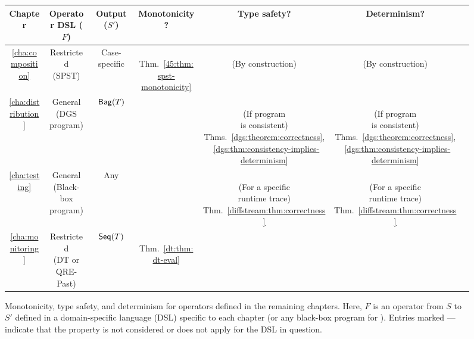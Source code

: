 \begin{figure}[t]
\centering
\footnotesize
\renewcommand{\arraystretch}{5}
\setlength{\tabcolsep}{4pt}
\begin{tabular}{ccccccc}
Chapter & Operator DSL ($F$) & Output ($S'$) & Monotonicity? & Type safety? & Determinism? \\
\hline
\ref{cha:composition}
  & \makecell{Restricted \\ (SPST)} & Case-specific
  & \makecell{\Yes{} \\ Thm.~\ref{45:thm:spst-monotonicity}} & \makecell{\Yes{} \\ (By construction)} & \makecell{\Yes{} \\ (By construction)} \\
\ref{cha:distribution}
  & \makecell{General \\ (DGS program)} & $\mathsf{Bag}({T})$
  & \Yes{} & \makecell{\Yes{} \\ (If program \\ is consistent) \\ Thms.~\ref{dgs:theorem:correctness},~\ref{dgs:thm:consistency-implies-determinism}} & \makecell{\Yes{} \\ (If program \\ is consistent) \\ Thms.~\ref{dgs:theorem:correctness},~\ref{dgs:thm:consistency-implies-determinism}} \\
\ref{cha:testing}
  & \makecell{General \\ (Black-box program)} & Any
  & \NA{} & \makecell{\Partial{} \\ (For a specific \\ runtime trace) \\ Thm.~\ref{diffstream:thm:correctness}} & \makecell{\Partial{} \\ (For a specific \\ runtime trace) \\ Thm.~\ref{diffstream:thm:correctness}} \\
\ref{cha:monitoring}
  & \makecell{Restricted \\ (DT or QRE-Past)} & $\mathsf{Seq}({T})$
  & \makecell{\Yes{} \\ Thm.~\ref{dt:thm:dt-eval}} & \NA{} & \Yes{} \\
\end{tabular}

\caption[Monotonicity, type safety, and determinism for the remaining chapters.]{Monotonicity, type safety, and determinism for operators defined in the remaining chapters. Here, $F$ is an operator from $S$ to $S'$ defined in a domain-specific language (DSL) specific to each chapter (or any black-box program for ). Entries marked --- indicate that the property is not considered or does not apply for the DSL in question.}
\label{fig:operator-properties-chapter-table}
\end{figure}

